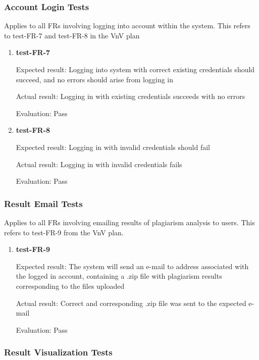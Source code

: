 \documentclass[12pt, titlepage]{article}
\begin{document}
\subsubsection{Account Login Tests}

Applies to all FRs involving logging into account within the system. This refers
to test-FR-7 and test-FR-8 in the VnV plan

\begin{enumerate}

\item{\textbf{test-FR-7}}

Expected result: Logging into system with correct existing credentials should
succeed, and no errors should arise from logging in

Actual result: Logging in with existing credentials succeeds with no errors

Evaluation: Pass

\item{\textbf{test-FR-8}}

Expected result: Logging in with invalid credentials should fail

Actual result: Logging in with invalid credentials fails

Evaluation: Pass
					
\end{enumerate}

\subsubsection{Result Email Tests}

Applies to all FRs involving emailing results of plagiarism analysis to users.
This refers to test-FR-9 from the VnV plan.

\begin{enumerate}

\item{\textbf{test-FR-9}}

Expected result: The system will send an e-mail to address associated with the
logged in account, containing a .zip file with plagiarism results
corresponding to the files uploaded

Actual result: Correct and corresponding .zip file was sent to the expected e-mail

Evaluation: Pass

\end{enumerate}

\subsubsection{Result Visualization Tests}
\end{document}

